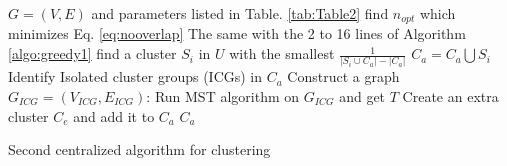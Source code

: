 \begin{algorithm}
\begin{algorithmic}[1]
\REQUIRE \(G=(V, E)\) and parameters listed in Table. \ref{tab:Table2}
\STATE find \(n_{opt}\) which minimizes Eq. \ref{eq:nooverlap}
  \STATE The same with the 2 to 16 lines of Algorithm \ref{algo:greedy1}
  	\REPEAT
		\STATE find a cluster \(S_i\) in \(U\) with the smallest \(\frac{1}{\left|S_i\cup C_a\right| - \left|C_a\right|}\)
		\STATE \(C_a=C_a\bigcup S_i\)
	\STATE Identify Isolated cluster groups (ICGs) in \(C_a\)
	\STATE Construct a graph \(G_{ICG}=(V_{ICG}, E_{ICG})\):
 \STATE Run MST algorithm on \(G_{ICG}\) and get \(T\)
		\STATE Create an extra cluster \(C_e\) and add it to \(C_a\)
	\ENDFOR
	\ENSURE \(C_a\)
\end{algorithmic}
\caption{Second centralized algorithm for clustering}
\label{algo:greedy2}
\end{algorithm}

\begin{comment}
We will use a simple example to demonstrate the two algorithms above. Figure \ref{fig:AlgorithmExampleNew}(a) plots a graph consisting of a total of 12 nodes. Assume we use the parameters associated with energy listed in Table 1 and the optimal \(n_{opt}\)=4. For simplicity, we also assume that the \(cond(S_i)<\gamma\) if \(\left|S_i\right| \geq p = 3\). Using the generated candidate cluster sets, 4 clusters are obtained using the first algorithm and illustrated in Figure \ref{fig:AlgorithmExampleNew}(b). Note that all these 4 clusters are connected through the overlapping nodes. Using the second algorithm, a total of 3 clusters are generated after all the 12 nodes have been covered (see Figure \ref{fig:AlgorithmExampleNew}(c)). However, these clusters do not overlap. Therefore, two extra clusters are generated to connect these isolated clusters. Note that since the minimum number of vibration patterns is 3, each extra cluster contains three nodes. The final clustering result of the second algorithm is shown in Figure \ref{fig:AlgorithmExampleNew}(d). The total amount of energy using the generated clusters from the first algorithm is about \(0.88\) times of that of the second algorithm. 

\begin{figure}
	\centering
		\texttt{[image: AlgorithmExampleNew.eps]}
	\caption{Example of using the Proposed Algorithms (a) Graph G(V,E), (b) The 4 Clusters Generated from the \(1^{st}\) Algorithm (c) Isolated Cluster Groups from the \(2^{nd}\) Algorithm (e) Final 5 Clusters from the \(2^{nd}\) Algorithm}
	\label{fig:AlgorithmExampleNew}
\end{figure}
\end{comment}

